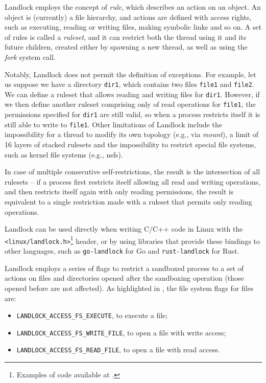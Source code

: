 Landlock employs the concept of \textit{rule}, which describes an action
on an object. An object is (currently) a file hierarchy, and actions are
defined with access rights, such as executing, reading or writing files, making
symbolic links and so on.
A set of rules is called a \textit{ruleset}, and it can restrict both the thread
using it and its future children, created either by spawning a new thread, as well
as using the \textit{fork} system call.

Notably, Landlock does not permit the definition of exceptions.
For example, let us suppose we have a directory \texttt{dir1}, which contains two files
\texttt{file1} and \texttt{file2}. We can define a ruleset that allows
reading and writing files for \texttt{dir1}.
However, if we then define another ruleset comprising only of read operations
for \texttt{file1}, the permissions specified for \texttt{dir1} are still
valid, so when a process restricts itself it is still able to write to \texttt{file1}.
Other limitations of Landlock include the impossibility for a thread to modify its own topology
(e.g., via \textit{mount}), a limit of 16 layers of stacked rulesets and the impossibility to
restrict special file systems, such as kernel file systems (e.g., nsfs).

In case of multiple consecutive self-restrictions, the result is the intersection
of all rulesets -- if a process first restricts itself allowing all read and writing operations,
and then restricts itself again with only reading permissions, the result is equivalent
to a single restriction made with a ruleset that permits only reading operations.

Landlock can be used directly when writing C/C++ code in Linux with the
\texttt{<linux/landlock.h>}\footnote{Examples of code available at \cite{landlock-user-space}.}
header, or by using libraries that provide these bindings to other languages,
such as \texttt{go-landlock} \cite{go-landlock}
for Go and \texttt{rust-landlock} \cite{rust-landlock} for Rust.

Landlock employs a series of flags to restrict a sandboxed process to a set of actions on files and
directories opened after the sandboxing operation (those opened before are not affected).
As highlighted in \cite{landlock-user-space}, the file system flags for files are:
\begin{itemize}
  \item \texttt{LANDLOCK\_ACCESS\_FS\_EXECUTE}, to execute a file;
  \item \texttt{LANDLOCK\_ACCESS\_FS\_WRITE\_FILE}, to open a file with write access;
  \item \texttt{LANDLOCK\_ACCESS\_FS\_READ\_FILE}, to open a file with read access.
\end{itemize}

